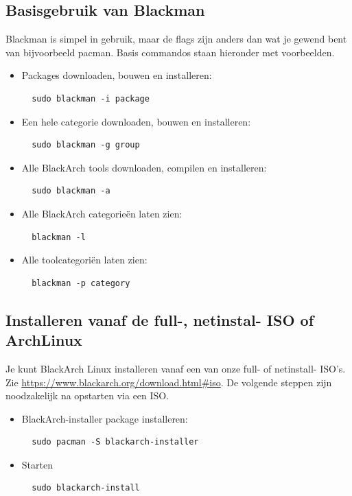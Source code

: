 \documentclass[a4paper, oneside, 11pt]{book}
\begin{document}
\subsection{Basisgebruik van Blackman} Blackman is simpel in gebruik, maar de flags zijn anders dan wat je gewend bent van bijvoorbeeld pacman. Basis commandos staan hieronder met voorbeelden.
\begin{itemize}
\item Packages downloaden, bouwen en installeren:
\begin{lstlisting}
  sudo blackman -i package
\end{lstlisting}

\item Een hele categorie downloaden, bouwen en installeren:
\begin{lstlisting}
  sudo blackman -g group
\end{lstlisting}

\item Alle BlackArch tools downloaden, compilen en installeren:
\begin{lstlisting}
  sudo blackman -a
\end{lstlisting}

\item Alle BlackArch categorieën laten zien:
\begin{lstlisting}
  blackman -l
\end{lstlisting}

\item Alle toolcategoriën laten zien:
\begin{lstlisting}
  blackman -p category
\end{lstlisting}

\end{itemize}

\subsection{Installeren vanaf de full-, netinstal- ISO of ArchLinux}
Je kunt BlackArch Linux installeren vanaf een van onze full- of netinstall- ISO's. \\ Zie \url{https://www.blackarch.org/download.html#iso}. 
De volgende steppen zijn noodzakelijk 
na opstarten via een ISO.
\begin{itemize}
\item BlackArch-installer package installeren:
\begin{lstlisting}
  sudo pacman -S blackarch-installer
\end{lstlisting}

\item Starten
\begin{lstlisting}
  sudo blackarch-install
\end{lstlisting}

\end{itemize}
\end{document}
